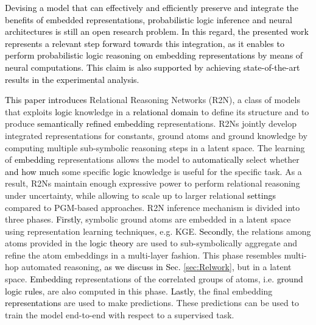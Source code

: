 \documentclass[journal]{IEEEtran}
\newcommand{\ar}[1]{\textcolor{black}{#1}}
\begin{document}
\ar{
Devising a model that can effectively and efficiently preserve and integrate the benefits of embedded representations, probabilistic logic inference and neural architectures is still an open research problem.}
\ar{In this regard, the presented work represents a relevant step forward towards this integration,
as it enables to perform probabilistic logic reasoning on embedding representations by means of neural computations.}
\ar{This claim is also supported by achieving state-of-the-art results in the experimental analysis.}

\ar{This paper introduces} Relational Reasoning Networks (R2N), a class of models that exploits \ar{logic} knowledge in a \ar{relational domain} to define its structure and to produce \ar{semantically refined embedding} representations.
R2Ns jointly develop integrated representations for constants, ground atoms and ground knowledge by computing multiple sub-symbolic reasoning steps in a latent space. 
The learning of \ar{embedding} representations allows the model to \ar{automatically} select whether \ar{and how much} some specific \ar{logic} knowledge is useful for the specific task. As a result, R2Ns maintain enough expressive power to perform relational reasoning under uncertainty, while allowing to scale up to larger relational \ar{settings} compared to PGM-based approaches. 
R2N inference mechanism is divided into three phases. \ar{Firstly}, symbolic ground atoms
are embedded in a latent space using representation learning techniques, e.g. KGE. \ar{Secondly}, the relations among atoms provided in the \ar{logic theory} are used to sub-symbolically aggregate and refine the atom embeddings in a multi-layer fashion. This phase resembles multi-hop automated reasoning\ar{, as we discuss in Sec. \ref{sec:Relwork},} but in a latent space. \ar{Embedding} representations of the \ar{cor}related groups of atoms, i.e. \ar{ground logic rules},
are also computed \ar{in} this phase.
\ar{Lastly}, the final embedding \ar{representations} are used to make predictions. These predictions can be used to train the model end-to-end with respect to a supervised task.
\end{document}
